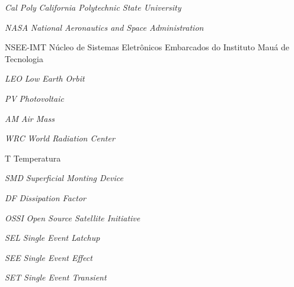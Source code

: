 \documentclass[
	12pt,				%
	openright,			%
	oneside,			%
	a4paper,			%
	english,			%
	french,				%
	spanish,			%
	brazil,				%
	oldfontcommands
	]{abntex2}
\begin{document}
\begin{siglas}

  \item[\textit{Cal Poly}] \textit{California Polytechnic State University}
  \item[\textit{NASA}] \textit{National Aeronautics and Space Administration}
  \item[NSEE-IMT] Núcleo de Sistemas Eletrônicos Embarcados do Instituto Mauá de Tecnologia
  \item[\textit{LEO}] \textit{Low Earth Orbit}
  \item[\textit{PV}] \textit{Photovoltaic}
  \item[\textit{AM}] \textit{Air Mass}
  \item[\textit{WRC}] \textit{World Radiation Center}
  \item[T] Temperatura
  \item[\textit{SMD}] \textit{Superficial Monting Device}
  \item[\textit{DF}] \textit{Dissipation Factor}
  \item[\textit{OSSI}] \textit{Open Source Satellite Initiative}
  \item[\textit{SEL}]\textit{Single Event Latchup}
  \item[\textit{SEE}]\textit{Single Event Effect}
  \item[\textit{SET}]\textit{Single Event Transient}
  
  
    
\end{siglas}


\tableofcontents*
\cleardoublepage



\textual

\end{document}
